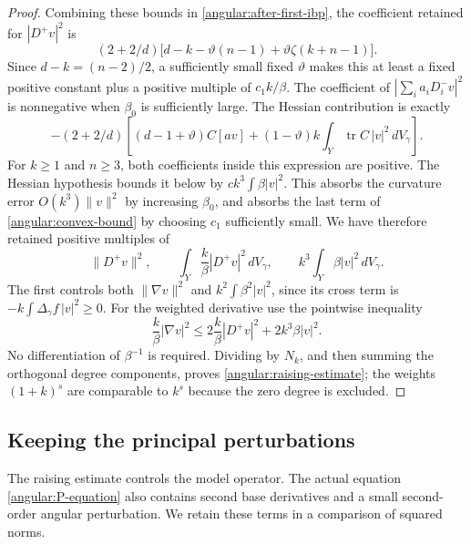 \documentclass[11pt]{article}
\theoremstyle{definition}
\theoremstyle{remark}
\DeclareMathOperator{\tr}{tr}
\numberwithin{equation}{section}
\begin{document}
\begin{proof}
Combining these bounds in \eqref{angular:after-first-ibp}, the coefficient
retained for $|D^+v|^2$ is
\begin{equation}\label{angular:positive-degree-factor}
 (2+2/d)\bigl[d-k-\vartheta(n-1)
                         +\vartheta\zeta(k+n-1)\bigr].
\end{equation}
Since $d-k=(n-2)/2$, a sufficiently small fixed $\vartheta$ makes this
at least a fixed positive constant plus a positive multiple of
$c_1k/\beta$.  The coefficient of
$|\sum_i a_iD_i^-v|^2$ is nonnegative when $\beta_0$ is sufficiently
large.  The Hessian contribution is exactly
\begin{equation}\label{angular:hessian-contribution}
 -(2+2/d)\left[(d-1+\vartheta)C[av]
       +(1-\vartheta)k\int_Y\tr C\,|v|^2\,dV_\gamma\right].
\end{equation}
For $k\ge1$ and $n\ge3$, both coefficients inside this expression are
positive.  The Hessian hypothesis bounds it below by
$c k^3\int\beta|v|^2$.  This absorbs the curvature error $O(k^3)\|v\|^2$
by increasing $\beta_0$, and absorbs the last term of
\eqref{angular:convex-bound} by choosing $c_1$ sufficiently small.
We have therefore retained positive multiples of
\[
 \|D^+v\|^2,\qquad
 \int_Y\frac{k}{\beta}|D^+v|^2\,dV_\gamma,
 \qquad k^3\int_Y\beta|v|^2\,dV_\gamma.
\]
The first controls both $\|\nabla v\|^2$ and
$k^2\int\beta^2|v|^2$, since its cross term is
$-k\int\Delta_\gamma f\,|v|^2\ge0$.  For the weighted derivative use the
pointwise inequality
\[
 \frac{k}{\beta}|\nabla v|^2
 \le2\frac{k}{\beta}|D^+v|^2+2k^3\beta|v|^2.
\]
No differentiation of $\beta^{-1}$ is required.  Dividing by $N_k$, and
then summing the orthogonal degree components, proves
\eqref{angular:raising-estimate}; the weights $(1+k)^s$ are comparable
to $k^s$ because the zero degree is excluded.
\end{proof}

\subsection{Keeping the principal perturbations}

The raising estimate controls the model operator.  The actual equation
\eqref{angular:P-equation} also contains second base derivatives and a
small second-order angular perturbation.  We retain these terms in a
comparison of squared norms.
\end{document}
